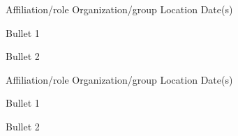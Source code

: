 

\begin{cventries}

  \cventry
    {Affiliation/role} %
    {Organization/group} %
    {Location} %
    {Date(s)} %
    {
      \begin{cvitems} %
        \item {Bullet 1}
        \item {Bullet 2}
      \end{cvitems}
    }

  \cventry
    {Affiliation/role} %
    {Organization/group} %
    {Location} %
    {Date(s)} %
    {
    \begin{cvitems} %
        \item {Bullet 1}
        \item {Bullet 2}
    \end{cvitems}
    }

\end{cventries}
